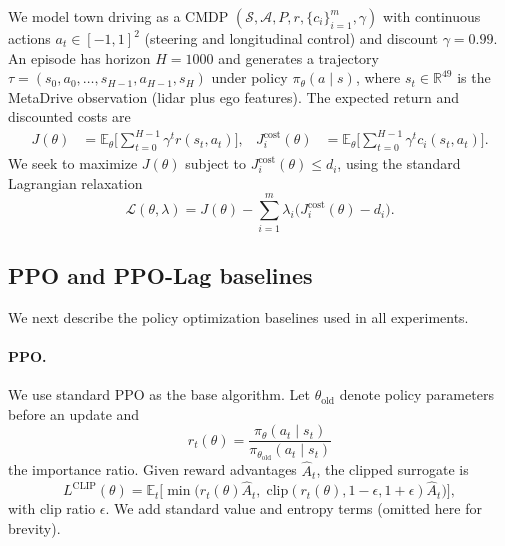 \documentclass[11pt]{article}
\begin{document}
We model town driving as a CMDP $(\mathcal{S},\mathcal{A},P,r,\{c_i\}_{i=1}^m,\gamma)$ with continuous actions $a_t\in[-1,1]^2$ (steering and longitudinal control) and discount $\gamma=0.99$.
An episode has horizon $H=1000$ and generates a trajectory $\tau=(s_0,a_0,\dots,s_{H-1},a_{H-1},s_H)$ under policy $\pi_\theta(a\mid s)$, where $s_t\in\mathbb{R}^{49}$ is the MetaDrive observation (lidar plus ego features).
The expected return and discounted costs are
\begin{align}
  J(\theta) &= \mathbb{E}_\theta\Big[\sum_{t=0}^{H-1}\gamma^t r(s_t,a_t)\Big], &
  J_i^{\text{cost}}(\theta) &= \mathbb{E}_\theta\Big[\sum_{t=0}^{H-1}\gamma^t c_i(s_t,a_t)\Big].
\end{align}
We seek to maximize $J(\theta)$ subject to $J_i^{\text{cost}}(\theta)\le d_i$, using the standard Lagrangian relaxation
\begin{equation}
  \mathcal{L}(\theta,\lambda)
  = J(\theta) - \sum_{i=1}^m \lambda_i\big(J_i^{\text{cost}}(\theta)-d_i\big).
  \label{eq:lagrangian}
\end{equation}

\subsection*{PPO and PPO-Lag baselines}

We next describe the policy optimization baselines used in all experiments.

\paragraph{PPO.}
We use standard PPO as the base algorithm.
Let $\theta_{\text{old}}$ denote policy parameters before an update and
\begin{equation}
    r_t(\theta)
    = \frac{\pi_\theta(a_t \mid s_t)}{\pi_{\theta_{\text{old}}}(a_t \mid s_t)}
\end{equation}
the importance ratio.
Given reward advantages $\hat{A}_t$, the clipped surrogate is
\begin{equation}
    L^{\text{CLIP}}(\theta)
    = \mathbb{E}_t\Big[\min\big(
        r_t(\theta)\hat{A}_t,\;
        \mathrm{clip}(r_t(\theta),1-\epsilon,1+\epsilon)\hat{A}_t
    \big)\Big],
\end{equation}
with clip ratio $\epsilon$.
We add standard value and entropy terms (omitted here for brevity).
\end{document}
